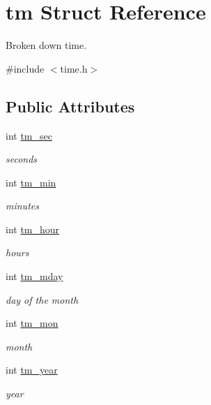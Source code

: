 \hypertarget{structtm}{}\section{tm Struct Reference}
\label{structtm}


Broken down time.  




{\ttfamily \#include $<$time.\+h$>$}

\subsection*{Public Attributes}
\begin{DoxyCompactItemize}
\item 
int \hyperlink{structtm_a4d098a9a5c03a00b2ee61e10851de81e}{tm\+\_\+sec}
\begin{DoxyCompactList}\small\item\em seconds \end{DoxyCompactList}\item 
int \hyperlink{structtm_af414eb7c86cc3099595211eee4d4211b}{tm\+\_\+min}
\begin{DoxyCompactList}\small\item\em minutes \end{DoxyCompactList}\item 
int \hyperlink{structtm_a3e7ca4e37f1abcaf56b8a916c38eb9fe}{tm\+\_\+hour}
\begin{DoxyCompactList}\small\item\em hours \end{DoxyCompactList}\item 
int \hyperlink{structtm_ab8d8904bad43b0c8b96e61941c5b5310}{tm\+\_\+mday}
\begin{DoxyCompactList}\small\item\em day of the month \end{DoxyCompactList}\item 
int \hyperlink{structtm_a112ac36fa2f593777138a417cf031e17}{tm\+\_\+mon}
\begin{DoxyCompactList}\small\item\em month \end{DoxyCompactList}\item 
int \hyperlink{structtm_a33adf78fd6476b2120ce3b9c4a852053}{tm\+\_\+year}
\begin{DoxyCompactList}\small\item\em year \end{DoxyCompactList}\item 

\end{DoxyCompactItemize}
